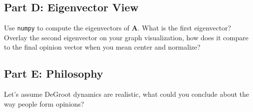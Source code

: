 \documentclass{article}
\begin{document}
\hypertarget{part-d-eigenvector-view}{%
\subsection*{Part D: Eigenvector View}\label{part-d-eigenvector-view}}

Use \texttt{numpy} to compute the eigenvectors of \(\mathbf{A}\). What is the first eigenvector? Overlay the second eigenvector on your graph visualization, how does it compare to the final opinion vector when you mean center and normalize?

\hypertarget{part-e-philosophy}{%
\subsection*{Part E: Philosophy}\label{part-e-philosophy}}

Let's assume DeGroot dynamics are realistic, what could you conclude about the way people form opinions?
\end{document}
